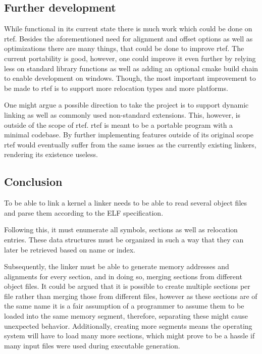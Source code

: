 \documentclass[notitlepage]{report}
\begin{document}
\subsection{Further development}

While functional in its current state there is much work which could be done on rtef. Besides the aforementioned need for alignment and offset options as well as optimizations there are many things, that could be done to improve rtef. The current portability is good, however, one could improve it even further by relying less on standard library functions as well as adding an optional cmake build chain to enable development on windows. Though, the most important improvement to be made to rtef is to support more relocation types and more platforms.

One might argue a possible direction to take the project is to support dynamic linking as well as commonly used non-standard extensions. This, however, is outside of the scope of rtef. rtef is meant to be a portable program with a minimal codebase. By further implementing features outside of its original scope rtef would eventually suffer from the same issues as the currently existing linkers, rendering its existence useless.

\subsection{Conclusion}

To be able to link a kernel a linker needs to be able to read several object files and parse them according to the ELF specification.

Following this, it must enumerate all symbols, sections as well as relocation entries. These data structures must be organized in such a way that they can later be retrieved based on name or index.

Subsequently, the linker must be able to generate memory addresses and alignments for every section, and in doing so, merging sections from different object files. It could be argued that it is possible to create multiple sections per file rather than merging those from different files, however as these sections are of the same name it is a fair assumption of a programmer to assume them to be loaded into the same memory segment, therefore, separating these might cause unexpected behavior. Additionally, creating more segments means the operating system will have to load many more sections, which might prove to be a hassle if many input files were used during executable generation.
\end{document}
